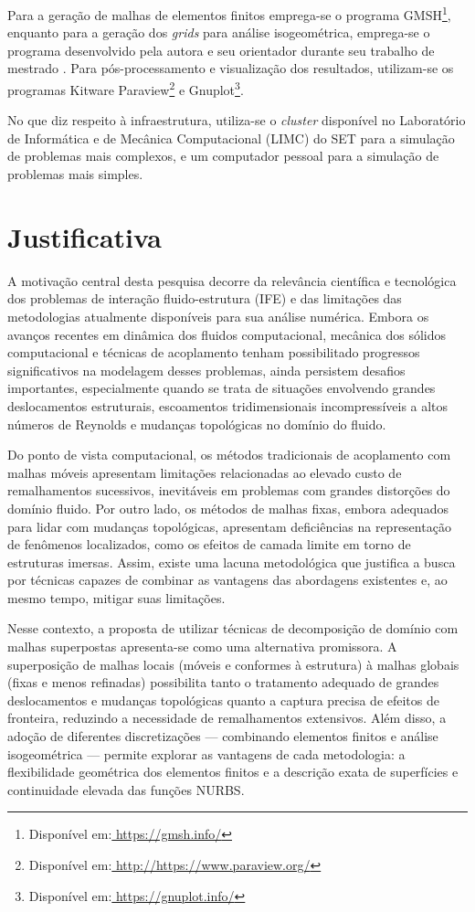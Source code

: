 Para a geração de malhas de elementos finitos emprega-se o programa GMSH\footnote{Disponível em:\url{ https://gmsh.info/}}, enquanto para a  geração dos \textit{grids} para análise isogeométrica, emprega-se o programa desenvolvido pela autora e seu orientador durante seu trabalho de mestrado \cite{Tonon:2016}. Para pós-processamento e visualização dos resultados, utilizam-se os programas Kitware Paraview\footnote{Disponível em:\url{ http://https://www.paraview.org/}} e  Gnuplot\footnote{Disponível em:\url{ https://gnuplot.info/}}. 

No que diz respeito à infraestrutura, utiliza-se o \textit{cluster} disponível no Laboratório de Informática e de Mecânica Computacional (LIMC) do SET para a simulação de problemas mais complexos, e um computador pessoal para a simulação de problemas mais simples.

\section[Justificativa]{Justificativa}

A motivação central desta pesquisa decorre da relevância científica e tecnológica dos problemas de interação fluido-estrutura (IFE) e das limitações das metodologias atualmente disponíveis para sua análise numérica. Embora os avanços recentes em dinâmica dos fluidos computacional, mecânica dos sólidos computacional e técnicas de acoplamento tenham possibilitado progressos significativos na modelagem desses problemas, ainda persistem desafios importantes, especialmente quando se trata de situações envolvendo grandes deslocamentos estruturais, escoamentos tridimensionais incompressíveis a altos números de Reynolds e mudanças topológicas no domínio do fluido.
	
Do ponto de vista computacional, os métodos tradicionais de acoplamento com malhas móveis apresentam limitações relacionadas ao elevado custo de remalhamentos sucessivos, inevitáveis em problemas com grandes distorções do domínio fluido. Por outro lado, os métodos de malhas fixas, embora adequados para lidar com mudanças topológicas, apresentam deficiências na representação de fenômenos localizados, como os efeitos de camada limite em torno de estruturas imersas. Assim, existe uma lacuna metodológica que justifica a busca por técnicas capazes de combinar as vantagens das abordagens existentes e, ao mesmo tempo, mitigar suas limitações.
	
Nesse contexto, a proposta de utilizar técnicas de decomposição de domínio com malhas superpostas apresenta-se como uma alternativa promissora. A superposição de malhas locais (móveis e conformes à estrutura) à malhas globais (fixas e menos refinadas) possibilita tanto o tratamento adequado de grandes deslocamentos e mudanças topológicas quanto a captura precisa de efeitos de fronteira, reduzindo a necessidade de remalhamentos extensivos. Além disso, a adoção de diferentes discretizações — combinando elementos finitos e análise isogeométrica — permite explorar as vantagens de cada metodologia: a flexibilidade geométrica dos elementos finitos e a descrição exata de superfícies e continuidade elevada das funções NURBS.

